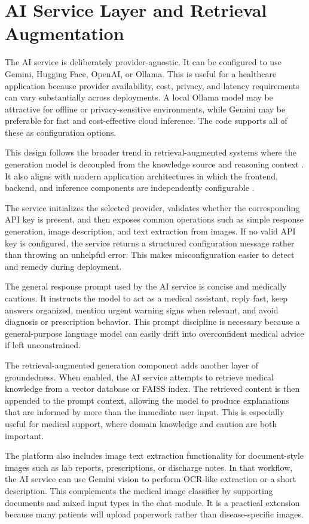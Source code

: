 \documentclass[conference]{IEEEtran}
\begin{document}
\section{AI Service Layer and Retrieval Augmentation}
The AI service is deliberately provider-agnostic. It can be configured to use Gemini, Hugging Face, OpenAI, or Ollama. This is useful for a healthcare application because provider availability, cost, privacy, and latency requirements can vary substantially across deployments. A local Ollama model may be attractive for offline or privacy-sensitive environments, while Gemini may be preferable for fast and cost-effective cloud inference. The code supports all of these as configuration options.

This design follows the broader trend in retrieval-augmented systems where the generation model is decoupled from the knowledge source and reasoning context \cite{rag}. It also aligns with modern application architectures in which the frontend, backend, and inference components are independently configurable \cite{fastapi,react,vite}.

The service initializes the selected provider, validates whether the corresponding API key is present, and then exposes common operations such as simple response generation, image description, and text extraction from images. If no valid API key is configured, the service returns a structured configuration message rather than throwing an unhelpful error. This makes misconfiguration easier to detect and remedy during deployment.

The general response prompt used by the AI service is concise and medically cautious. It instructs the model to act as a medical assistant, reply fast, keep answers organized, mention urgent warning signs when relevant, and avoid diagnosis or prescription behavior. This prompt discipline is necessary because a general-purpose language model can easily drift into overconfident medical advice if left unconstrained.

The retrieval-augmented generation component adds another layer of groundedness. When enabled, the AI service attempts to retrieve medical knowledge from a vector database or FAISS index. The retrieved content is then appended to the prompt context, allowing the model to produce explanations that are informed by more than the immediate user input. This is especially useful for medical support, where domain knowledge and caution are both important.

The platform also includes image text extraction functionality for document-style images such as lab reports, prescriptions, or discharge notes. In that workflow, the AI service can use Gemini vision to perform OCR-like extraction or a short description. This complements the medical image classifier by supporting documents and mixed input types in the chat module. It is a practical extension because many patients will upload paperwork rather than disease-specific images.
\end{document}
